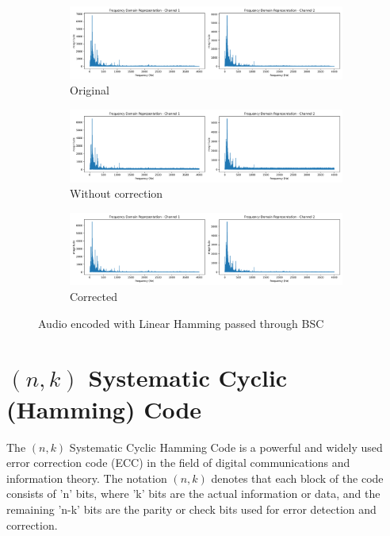 \documentclass{article}
\begin{document}
\begin{figure}[htb]
    \centering
    \begin{subfigure}[b]{\textwidth}
        \centering
        \includegraphics[width=\textwidth]{../Result/wav-frequency-domain-TX.png}
        \caption{Original}
        \label{fig:f-audio-linear-bsc-original}
    \end{subfigure}
    \begin{subfigure}[b]{\textwidth}
        \centering
        \includegraphics[width=\textwidth]{../Result/linear-bsc-wav-frequency-domain-RX.png}
        \caption{Without correction}
        \label{fig:f-audio-linear-bsc-no-correction}
    \end{subfigure}
    \begin{subfigure}[b]{\textwidth}
        \centering
        \includegraphics[width=\textwidth]{../Result/linear-bsc-wav-frequency-domain-RX-syndrome-corrected.png}
        \caption{Corrected}
        \label{fig:f-audio-linear-bsc-syndrome-corrected}
    \end{subfigure}
       \caption{Audio encoded with Linear Hamming passed through BSC}
       \label{fig:f-audio-linear-bsc}
\end{figure}


\section{$(n,k)$ Systematic Cyclic (Hamming) Code}
The $(n,k)$ Systematic Cyclic Hamming Code is a powerful and widely used error correction code (ECC) in the field of digital communications and information theory. The notation $(n,k)$ denotes that each block of the code consists of 'n' bits, where 'k' bits are the actual information or data, and the remaining 'n-k' bits are the parity or check bits used for error detection and correction.
\end{document}
